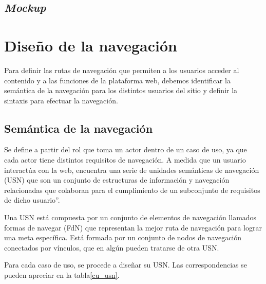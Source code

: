 \subsection{\textit{Mockup}}




\section{Diseño de la navegación}
Para definir las rutas de navegación que permiten a los usuarios acceder al contenido y a las funciones de la plataforma web, debemos identificar la semántica de la navegación para los distintos usuarios del sitio y definir la sintaxis para efectuar la navegación.


\subsection{Semántica de la navegación}
Se define a partir del rol que toma un actor dentro de un caso de uso, ya que cada actor tiene distintos requisitos de navegación. A medida que un usuario interactúa con la web, encuentra una serie de unidades semánticas de navegación (USN) que son un conjunto de estructuras de información y navegación relacionadas que colaboran para el cumplimiento de un subconjunto de requisitos de dicho usuario”.


Una USN está compuesta por un conjunto de elementos de navegación llamados formas de navegar (FdN) que representan la mejor ruta de navegación para lograr una meta específica. Está formada por un conjunto de nodos de navegación conectados por vínculos, que en algún pueden tratarse de otra USN.


Para cada caso de uso, se procede a diseñar su USN. Las correspondencias se pueden apreciar en la tabla\ref{cu_usn}.


